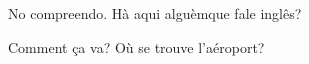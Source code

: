 \documentclass{article}
\begin{document}
No compreendo. H\`{a} aqui algu\` {e}mque fale ingl\^{e}s?

Comment \c{c}a va? O\`{u} se trouve l'a\'{e}roport?
\end{document}
